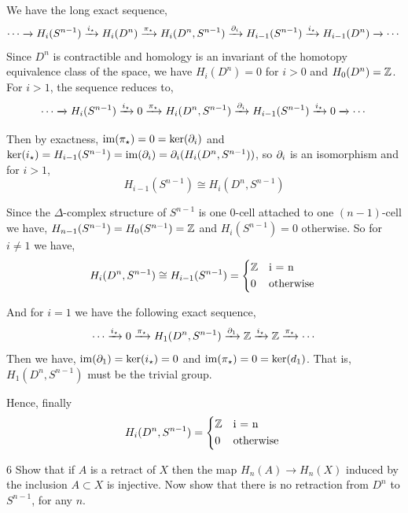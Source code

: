 \documentclass[12pt]{article}
\begin{document}
\begin{solution}
    \bbni
    
    We have the long exact sequence,
    \[\cdots \xrightarrow{} H_i(S^{n-1}) \xrightarrow{i_\star} H_i(D^n) \xrightarrow{\pi_\star} H_i(D^n, S^{n-1}) \xrightarrow{\partial_i} H_{i-1} (S^{n-1}) \xrightarrow{i_\star} H_{i-1}(D^n) \xrightarrow{} \cdots\]
    Since $D^n$ is contractible and homology is an invariant of the homotopy equivalence class of the space, we have $H_i(D^n) = 0$ for $i > 0$ and $H_0(D^n) = \mathbb Z$. For $i > 1$, the sequence reduces to,
    \[\cdots \xrightarrow{} H_i(S^{n-1}) \xrightarrow{i_\star} 0 \xrightarrow{\pi_\star} H_i(D^n, S^{n-1}) \xrightarrow{\partial_i} H_{i-1} (S^{n-1}) \xrightarrow{i_\star} 0 \xrightarrow{} \cdots\]

    Then by exactness, $\operatorname{im}(\pi_\star) = 0 = \ker(\partial_i)$ and $\ker(i_\star) = H_{i-1}(S^{n-1}) = \operatorname{im}(\partial_i) = \partial_i(H_i(D^n, S^{n-1}))$, so $\partial_i$ is an isomorphism and for $i > 1$,
    \[H_{i-1}(S^{n-1}) \cong H_i(D^n, S^{n-1})\]

    Since the $\Delta$-complex structure of $S^{n-1}$ is one $0$-cell attached to one $(n-1)$-cell we have, $H_{n-1}(S^{n-1}) = H_0(S^{n-1}) = \mathbb Z$ and $H_i(S^{n-1}) = 0$ otherwise. So for $ i \neq 1$ we have, 
    \[H_i(D^n, S^{n-1}) \cong H_{i-1} (S^{n-1}) = \begin{cases*}
        \Z & i = n \\
        0 & otherwise
    \end{cases*}\]

    And for $i = 1$ we have the following exact sequence,
    \[\cdots \xrightarrow{i_\star} 0 \xrightarrow{\pi_\star} H_1(D^n, S^{n-1}) \xrightarrow{\partial_1} \mathbb Z \xrightarrow{i_\star} \mathbb Z \xrightarrow{\pi_\star} \cdots\]
    Then we have, $\operatorname{im}(\partial_1) = \ker(i_\star) = 0$ and $\operatorname{im}(\pi_\star) = 0 = \ker(d_1)$. That is, $H_1(D^n, S^{n-1})$ must be the trivial group.

    Hence, finally 
    \[H_i(D^n, S^{n-1}) = \begin{cases*}
        \Z & i = n \\
        0 & otherwise
    \end{cases*}\]
\end{solution}

\newpage 

\begin{problem}{6}
    Show that if $A$ is a retract of $X$ then the map $H_n(A)\to H_n(X)$ induced by the inclusion $A \subset X$ is injective. Now show that there is no retraction from $D^n$ to $S^{n-1}$, for any $n$.
\end{problem}
\end{document}
